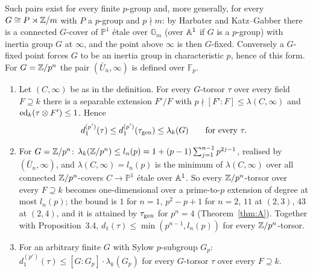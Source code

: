 Such pairs exist for every finite $p$-group and, more generally, for every
$G\cong P\rtimes\mathbb Z/m$ with $P$ a $p$-group and $p\nmid m$: by Harbater and Katz--Gabber
\cite{Ha,Ka} there is a connected $G$-cover of $\mathbb P^1$ \'etale over
$\mathbb G_m$ (over $\mathbb A^1$ if $G$ is a $p$-group) with inertia group $G$ at $\infty$, and
the point above $\infty$ is then $G$-fixed. Conversely a $G$-fixed point forces $G$ to be
an inertia group in characteristic $p$, hence of this form. For $G=\mathbb Z/p^n$ the pair
$(\bar U_n,\infty)$ is defined over $\mathbb F_p$.

\begin{theorem}\label{thm:qRV}
\begin{enumerate}
\item[(a)] Let $(C,\infty)$ be as in the definition. For every $G$-torsor $\tau$ over
every field $F\supseteq k$ there is a separable extension $F'/F$ with $p\nmid[F':F]\le
\lambda(C,\infty)$ and $\operatorname{ed}_k(\tau\otimes F')\le1$. Hence
\[
d_1^{(p')}(\tau)\le d_1^{(p')}(\tau_{\mathrm{gen}})\le\lambda_k(G)\qquad\text{for every }\tau .
\]
\item[(b)] For $G=\mathbb Z/p^n$: $\lambda_k(\mathbb Z/p^n)\le l_n(p)=1+(p-1)\sum_{j=1}^{n-1}p^{2j-1}$,
realised by $(\bar U_n,\infty)$, and $\lambda(C,\infty)=l_n(p)$ is the minimum of
$\lambda(C,\infty)$ over all connected $\mathbb Z/p^n$-covers $C\to\mathbb P^1$ \'etale over
$\mathbb A^1$. So every $\mathbb Z/p^n$-torsor over every $F\supseteq k$ becomes one-dimensional over
a prime-to-$p$ extension of degree at most $l_n(p)$; the bound is $1$ for $n=1$,
$p^2-p+1$ for $n=2$, $11$ at $(2,3)$, $43$ at $(2,4)$, and it is attained by
$\tau_{\mathrm{gen}}$ for $p^n=4$ (Theorem~\ref{thm:A}). Together with Proposition~3.4,
$d_1(\tau)\le\min(p^{n-1},l_n(p))$ for every $\mathbb Z/p^n$-torsor.
\item[(c)] For an arbitrary finite $G$ with Sylow $p$-subgroup $G_p$:
$d_1^{(p')}(\tau)\le[G:G_p]\cdot\lambda_k(G_p)$ for every $G$-torsor $\tau$ over every
$F\supseteq k$.
\end{enumerate}
\end{theorem}

